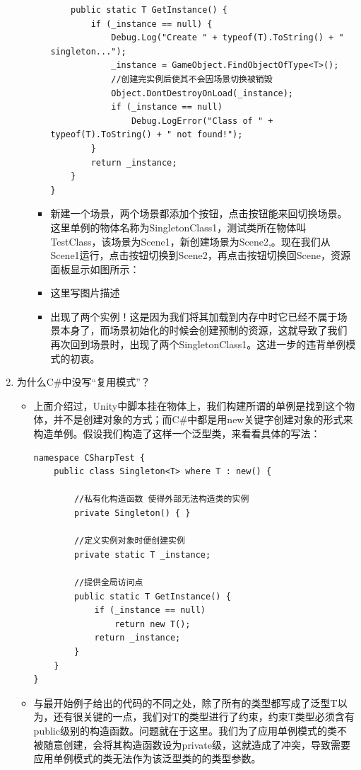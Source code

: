 \documentclass[9pt, b5paper]{article}
\begin{document}
\begin{enumerate}
\begin{enumerate}
\begin{itemize}
\begin{verbatim}
    public static T GetInstance() {
        if (_instance == null) {
            Debug.Log("Create " + typeof(T).ToString() + " singleton...");
            _instance = GameObject.FindObjectOfType<T>();
            //创建完实例后使其不会因场景切换被销毁
            Object.DontDestroyOnLoad(_instance);
            if (_instance == null)
                Debug.LogError("Class of " + typeof(T).ToString() + " not found!");
        }
        return _instance;
    }
}
\end{verbatim}
\item 新建一个场景，两个场景都添加个按钮，点击按钮能来回切换场景。这里单例的物体名称为SingletonClass1，测试类所在物体叫TestClass，该场景为Scene1，新创建场景为Scene2,。现在我们从Scene1运行，点击按钮切换到Scene2，再点击按钮切换回Scene，资源面板显示如图所示：
\item 这里写图片描述
\item 出现了两个实例！这是因为我们将其加载到内存中时它已经不属于场景本身了，而场景初始化的时候会创建预制的资源，这就导致了我们再次回到场景时，出现了两个SingletonClass1。这进一步的违背单例模式的初衷。
\end{itemize}
\end{enumerate}
\item 为什么C\#中没写“复用模式”？
\label{sec:org95f71c9}
\begin{itemize}
\item 上面介绍过，Unity中脚本挂在物体上，我们构建所谓的单例是找到这个物体，并不是创建对象的方式；而C\#中都是用new关键字创建对象的形式来构造单例。假设我们构造了这样一个泛型类，来看看具体的写法：
\begin{verbatim}
namespace CSharpTest {
    public class Singleton<T> where T : new() {
        
        //私有化构造函数 使得外部无法构造类的实例
        private Singleton() { }
        
        //定义实例对象时便创建实例
        private static T _instance;
        
        //提供全局访问点
        public static T GetInstance() {
            if (_instance == null)
                return new T();
            return _instance;
        }
    }
}
\end{verbatim}
\item 与最开始例子给出的代码的不同之处，除了所有的类型都写成了泛型T以为，还有很关键的一点，我们对T的类型进行了约束，约束T类型必须含有public级别的构造函数。问题就在于这里。我们为了应用单例模式的类不被随意创建，会将其构造函数设为private级，这就造成了冲突，导致需要应用单例模式的类无法作为该泛型类的的类型参数。
\end{itemize}
\end{enumerate}
\end{document}
